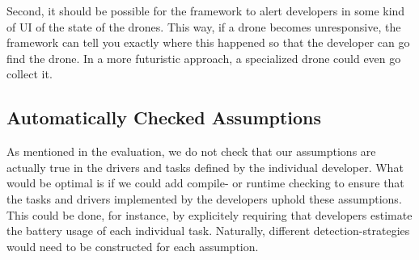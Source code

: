 Second, it should be possible for the framework to alert developers in some kind of UI of the state of the drones. This way, if a drone becomes unresponsive, the framework can tell you exactly where this happened so that the developer can go find the drone. In a more futuristic approach, a specialized drone could even go collect it.

\subsection{Automatically Checked Assumptions}
As mentioned in the evaluation, we do not check that our assumptions are actually true in the drivers and tasks defined by the individual developer. What would be optimal is if we could add compile- or runtime checking to ensure that the tasks and drivers implemented by the developers uphold these assumptions. This could be done, for instance, by explicitely requiring that developers estimate the battery usage of each individual task. Naturally, different detection-strategies would need to be constructed for each assumption.